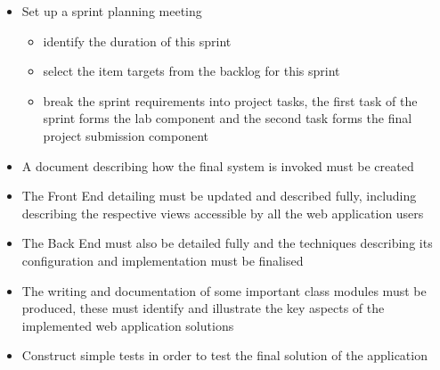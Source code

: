 \documentclass[10pt, a4paper, onecolumn]{scrartcl}
\begin{document}
			\begin{itemize}[noitemsep]
				\item Set up a sprint planning meeting
					\begin{itemize}
						\item identify the duration of this sprint
						\item select the item targets from the backlog for this sprint
						\item break the sprint requirements into project tasks, the first task of the sprint forms the lab component and the second task forms the final project submission component
					\end{itemize}
				\item A document describing how the final system is invoked must be created
				\item The Front End detailing must be updated and described fully, including describing the respective views accessible by all the web application users
				\item The Back End must also be detailed fully and the techniques describing its configuration and implementation must be finalised
				\item The writing and documentation of some important class modules must be produced, these must identify and illustrate the key aspects of the implemented web application solutions
				\item Construct simple tests in order to test the final solution of the application
			\end{itemize}	
				
				
				

				
			
			
	
	
\end{document}
